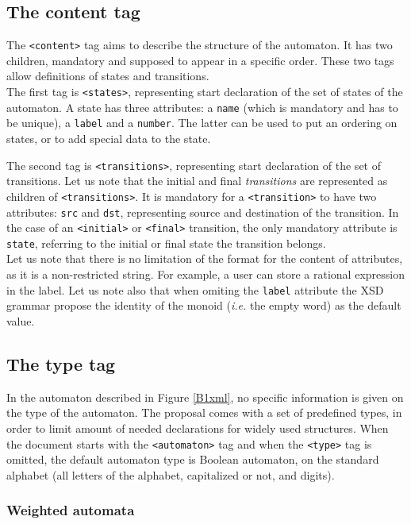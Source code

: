 \documentclass[a4paper]{llncs}
\begin{document}
\subsection{The content tag}
The \verb|<content>| tag aims to describe the structure of the
automaton. It has two children, mandatory and supposed to appear in a
specific order. These two tags allow definitions of states and
transitions. \\

The first tag is \verb|<states>|, representing start declaration of
the set of states of the automaton. A state has three attributes: a
\verb|name| (which is mandatory and has to be unique), a \verb|label|
and a \verb|number|. The latter can be used to put an ordering on states,
or to add special data to the state.

The second tag is \verb|<transitions>|, representing start declaration
of the set of transitions. Let us note that the initial and final
\textit{transitions} are represented as children of
\verb|<transitions>|. It is mandatory for a \verb|<transition>| to
have two attributes: \verb|src| and \verb|dst|, representing source
and destination of the transition. In the case of an \verb|<initial>|
or \verb|<final>| transition, the only mandatory attribute is
\verb|state|, referring to
the initial or final state the transition belongs.\\

Let us note that there is no limitation of the format for the content
of attributes, as it is a non-restricted string. For example, a user
can store a rational expression in the label.  Let us note also that
when omiting the \verb|label| attribute the XSD grammar propose the
identity of the monoid ({\it i.e.} the empty word) as the default value.

\subsection{The type tag}
In the automaton described in Figure \ref{B1xml}, no specific
information is given on the type of the automaton. The proposal comes
with a set of predefined types, in order to limit amount of needed
declarations for widely used structures. When the document starts with
the \verb|<automaton>| tag and when the \verb|<type>| tag is omitted,
the default automaton type is Boolean automaton, on the standard
alphabet (all letters of the alphabet, capitalized or not, and digits).


\subsubsection{Weighted automata}
\label{weightedautomata}
\end{document}

